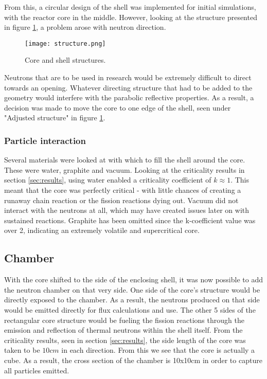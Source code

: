 From this, a circular design of the shell was implemented for initial simulations, with the reactor core in the middle. However, looking at the structure presented in figure \ref{fig:structure}, a problem arose with neutron direction.

\begin{figure}[!htbp]
\caption{Core and shell structures.}
\label{fig:structure}
\centering
\texttt{[image: structure.png]}
\end{figure}

Neutrons that are to be used in research would be extremely difficult to direct towards an opening. Whatever directing structure that had to be added to the geometry would interfere with the parabolic reflective properties. As a result, a decision was made to move the core to one edge of the shell, seen under "Adjusted structure" in figure \ref{fig:structure}.

\subsubsection{Particle interaction}

Several materials were looked at with which to fill the shell around the core. These were water, graphite and vacuum. Looking at the criticality results in section \ref{sec:results}, using water enabled a criticality coefficient of $k\approx 1$. This meant that the core was perfectly critical - with little chances of creating a runaway chain reaction or the fission reactions dying out. Vacuum did not interact with the neutrons at all, which may have created issues later on with sustained reactions. Graphite has been omitted since the k-coefficient value was over 2, indicating an extremely volatile and supercritical core.

\subsection{Chamber}

With the core shifted to the side of the enclosing shell, it was now possible to add the neutron chamber on that very side. One side of the core's structure would be directly exposed to the chamber. As a result, the neutrons produced on that side would be emitted directly for flux calculations and use. The other 5 sides of the rectangular core structure would be fueling the fission reactions through the emission and reflection of thermal neutrons within the shell itself. From the criticality results, seen in section \ref{sec:results}, the side length of the core was taken to be $10cm$ in each direction. From this we see that the core is actually a cube. As a result, the cross section of the chamber is 10x10cm in order to capture all particles emitted.

